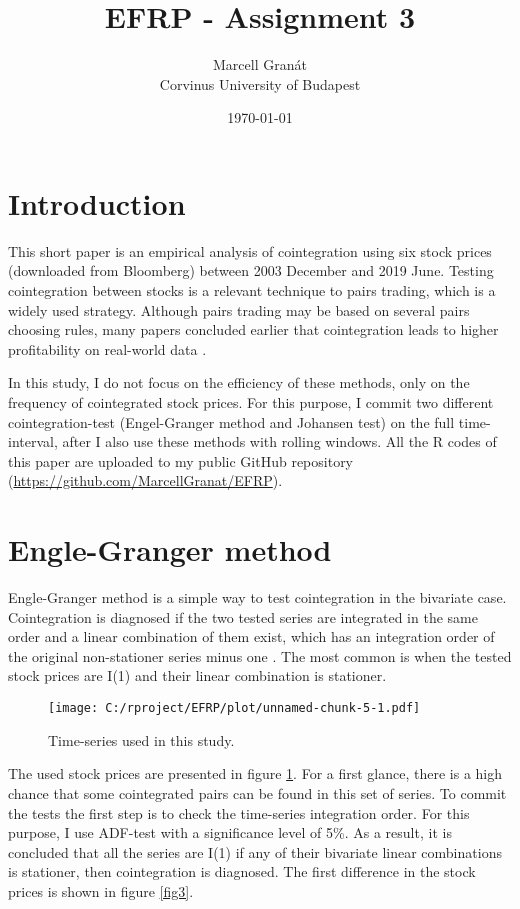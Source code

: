 \documentclass[12pt, a4paper, twoside, titlepage]{article}
\title{EFRP - Assignment 3}
\date{\today}
\author{Marcell Granát \\ Corvinus University of Budapest}
\begin{document}
  \maketitle
  \tableofcontents
  

\section{Introduction}
\setcounter{page}{1}

This short paper is an empirical analysis of cointegration using six stock prices (downloaded from Bloomberg) between 2003 December and 2019 June. Testing cointegration between stocks is a relevant technique to pairs trading, which is a widely used strategy. Although pairs trading may be based on several pairs choosing rules, many papers concluded earlier that cointegration leads to higher profitability on real-world data \cite{Huck.2014}.

In this study, I do not focus on the efficiency of these methods, only on the frequency of cointegrated stock prices. For this purpose, I commit two different cointegration-test (Engel-Granger method and Johansen test) on the full time-interval, after I also use these methods with rolling windows. All the R codes of this paper are uploaded to my public GitHub repository (\href{https://github.com/MarcellGranat/EFRP/blob/master/Exercise-3.md}{https://github.com/MarcellGranat/EFRP}). 

\section{Engle-Granger method}

Engle-Granger method is a simple way to test cointegration in the bivariate case. Cointegration is diagnosed if the two tested series are integrated in the same order and a linear combination of them exist, which has an integration order of the original non-stationer series minus one \cite{Kirchgassner.2007}. The most common is when the tested stock prices are I(1) and their linear combination is stationer.

\begin{figure}[ht]
  \centering
  \texttt{[image: C:/rproject/EFRP/plot/unnamed-chunk-5-1.pdf]}
  \caption{Time-series used in this study.}
  \label{fig1}
\end{figure}

The used stock prices are presented in figure \ref{fig1}. For a first glance, there is a high chance that some cointegrated pairs can be found in this set of series. To commit the tests the first step is to check the time-series integration order. For this purpose, I use ADF-test with a significance level of 5\%. As a result, it is concluded that all the series are I(1) if any of their bivariate linear combinations is stationer, then cointegration is diagnosed. The first difference in the stock prices is shown in figure \ref{fig3}.
\end{document}
